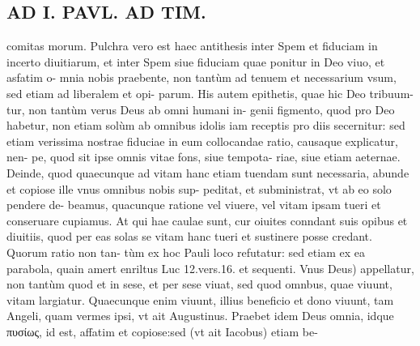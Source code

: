 \documentclass{article}
\begin{document}
\begin{pages}
\section*{AD I. PAVL. AD TIM. }
\marginpar{[ p.330) ]}\pstart comitas morum.  \pend\pstart Pulchra vero est haec antithesis inter Spem et fiduciam in incerto diuitiarum, et inter Spem siue fiduciam quae ponitur in Deo viuo, et asfatim o- mnia nobis praebente, non tantùm ad tenuem et necessarium vsum, sed etiam ad liberalem et opi- parum. His autem epithetis, quae hic Deo tribuum- tur, non tantùm verus Deus ab omni humani in- genii figmento, quod pro Deo habetur, non etiam solùm ab omnibus idolis iam receptis pro diis secernitur: sed etiam verissima nostrae fiduciae in eum collocandae ratio, causaque explicatur, nen- pe, quod sit ipse omnis vitae fons, siue tempota- riae, siue etiam aeternae. Deinde, quod quaecunque ad vitam hanc etiam tuendam sunt necessaria, abunde et copiose ille vnus omnibus nobis sup- peditat, et subministrat, vt ab eo solo pendere de- beamus, quacunque ratione vel viuere, vel vitam ipsam tueri et conseruare cupiamus. At qui hae caulae sunt, cur oiuites conndant suis opibus et diuitiis, quod per eas solas se vitam hanc tueri et sustinere posse credant. Quorum ratio non tan- tùm ex hoc Pauli loco refutatur: sed etiam ex ea parabola, quain amert enriltus Luc 12.vers.16. et sequenti.  \pend\pstart Vnus Deus) appellatur, non tantùm quod et in sese, et per sese viuat, sed quod omnbus, quae viuunt, vitam largiatur. Quaecunque enim viuunt, illius beneficio et dono viuunt, tam Angeli, quam vermes ipsi, vt ait Augustinus.  \pend\pstart Praebet idem Deus omnia, idque πυσίως, id est, affatim et copiose:sed (vt ait Iacobus) etiam be-  \pend

\end{pages}
\end{document}
